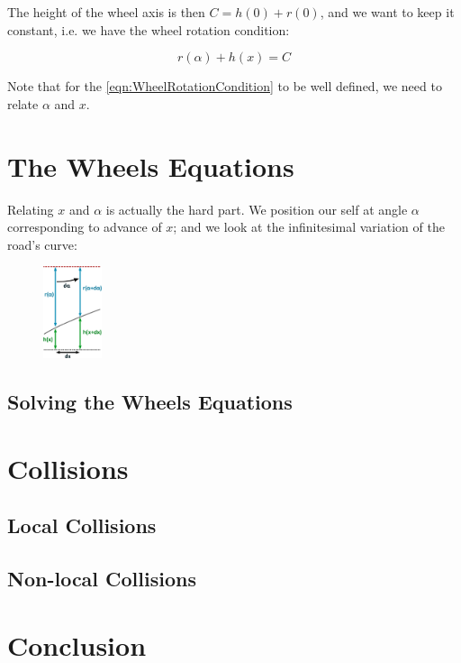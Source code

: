 \documentclass[]{article}
\begin{document}
	The height of the wheel axis is then $C = h(0)+r(0)$, and we want to keep it constant, i.e. we have the wheel rotation condition:
	
	\begin{equation}
		\tag{Wheel Rotation Condition}
		r(\alpha)+h(x)=C
		\label{eqn:WheelRotationCondition}
	\end{equation}
	
	Note that for the \eqref{eqn:WheelRotationCondition} to be well defined, we need to relate $\alpha$ and $x$.
	
	
	\section{The Wheels Equations}
	Relating $x$ and $\alpha$ is actually the hard part.
	We position our self at angle $\alpha$ corresponding to advance of $x$; and we look at the infinitesimal variation of the road's curve:
	
	\begin{figure}[h!] 
		\centering
		\includegraphics[height=2.7cm]{infinitesimal_scheme}
		\label{fig:infinitesimal_scheme}
	\end{figure}




	\subsection{Solving the Wheels Equations}
	
	\section{Collisions}
	\subsection{Local Collisions}
	\subsection{Non-local Collisions}
	
	\section{Conclusion}
	
\end{document}
